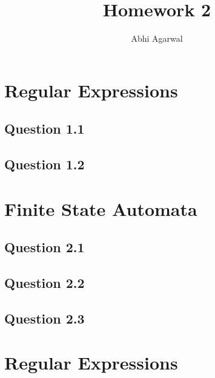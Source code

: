 \documentclass[11pt, oneside]{article}   	%
\title{Homework 2}
\author{Abhi Agarwal}
\date{}
\begin{document}
\maketitle
\section{Regular Expressions}
\subsection{Question 1.1}
\par 

\subsection{Question 1.2}

\section{Finite State Automata}
\subsection{Question 2.1}
\par 

\subsection{Question 2.2}

\subsection{Question 2.3}

\section{Regular Expressions}
\par 
\end{document}
